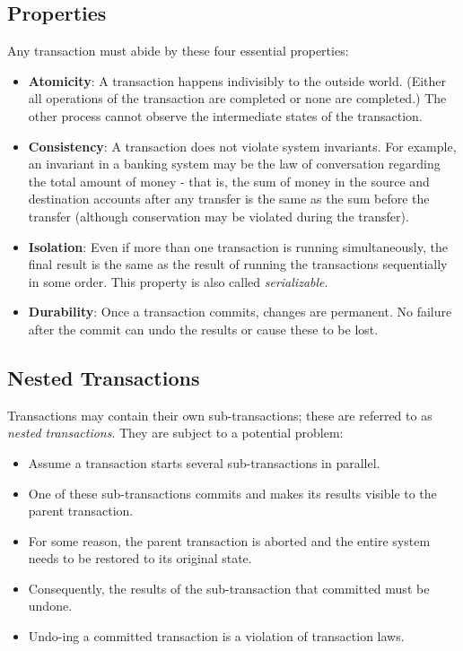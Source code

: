 \subsection{Properties}
Any transaction must abide by these four essential properties: \begin{itemize}
\item \textbf{Atomicity}: A transaction happens indivisibly to the outside world. (Either all operations of the transaction are completed or none are completed.) The other process cannot observe the intermediate states of the transaction. 

\item \textbf{Consistency}: A transaction does not violate system invariants. For example, an invariant in a banking system may be the law of conversation regarding the total amount of money - that is, the sum of money in the source and destination accounts after any transfer is the same as the sum before the transfer (although conservation may be violated during the transfer). 

\item \textbf{Isolation}: Even if more than one transaction is running simultaneously, the final result is the same as the result of running the transactions sequentially in some order. This property is also called \textit{serializable}.

\item \textbf{Durability}: Once a transaction commits, changes are permanent. No failure after the commit can undo the results or cause these to be lost. 
\end{itemize}

\subsection{Nested Transactions}
Transactions may contain their own sub-transactions; these are referred to as \textit{nested transactions}. They are subject to a potential problem: \begin{itemize}
\item Assume a transaction starts several sub-transactions in parallel.  
\item One of these sub-transactions commits and makes its results visible to the parent transaction. 
\item For some reason, the parent transaction is aborted and the entire system needs to be restored to its original state. 
\item Consequently, the results of the sub-transaction that committed must be undone. 
\item Undo-ing a committed transaction is a violation of transaction laws.
\end{itemize}

